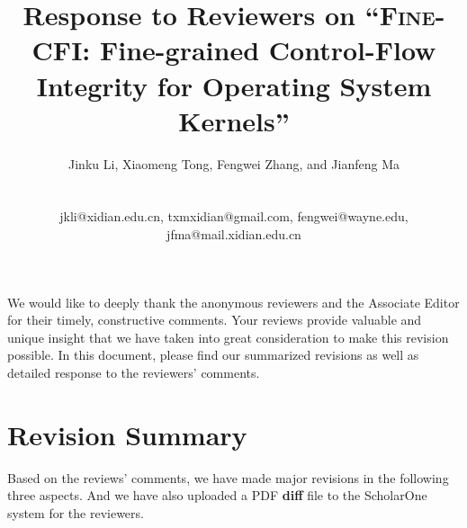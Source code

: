 \documentclass[oneside, 11pt]{article}
\begin{document}
\setcounter{page}{1}

\newcommand{\TheName}{\textsc{Fine-CFI}}

\title{Response to Reviewers on ``\TheName{}: Fine-grained Control-Flow
Integrity for Operating System Kernels''}

\author{Jinku Li, Xiaomeng Tong, Fengwei Zhang, and Jianfeng Ma \\
\\
\vspace{0.2in}
\begin{small}
\begin{tabular}{cc}
jkli@xidian.edu.cn, txmxidian@gmail.com, fengwei@wayne.edu, jfma@mail.xidian.edu.cn\\
\end{tabular}
\end{small}
}

\date{}
\maketitle


%
%

We would like to deeply thank the anonymous reviewers and the Associate
Editor for their timely, constructive comments. Your reviews provide
valuable and unique insight that we have taken into great consideration
to make this revision possible. In this document, please find our summarized
revisions as well as detailed response to the reviewers' comments.

\section{Revision Summary}
Based on the reviews' comments, we have made major revisions in the
following three aspects. And we have also uploaded a PDF \textbf{diff} file to the
ScholarOne system for the reviewers.
\end{document}
